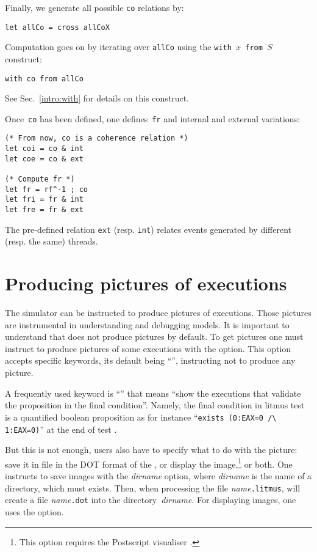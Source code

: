 Finally, we generate all possible \texttt{co} relations by:
\begin{verbatim}
let allCo = cross allCoX
\end{verbatim}

Computation goes on by iterating over \texttt{allCo} using
the \texttt{with $x$ from~$S$} construct:
\begin{verbatim}
with co from allCo
\end{verbatim}
See Sec.~\ref{intro:with} for details on this construct.

Once~\texttt{co} has been defined, one defines~\texttt{fr} and
internal and external variations:
\begin{verbatim}
(* From now, co is a coherence relation *)
let coi = co & int
let coe = co & ext

(* Compute fr *)
let fr = rf^-1 ; co
let fri = fr & int
let fre = fr & ext
\end{verbatim}
The pre-defined relation \texttt{ext} (resp. \texttt{int}) relates
events generated by different (resp. the same) threads.


\section{Producing pictures of executions}
The simulator \herd{} can be instructed to produce pictures of
executions.
Those pictures are instrumental in understanding and
debugging models.
It is important to understand that \herd{} does not produce pictures
by default. To get pictures one must instruct \herd{} to produce
pictures of some executions with the  option.
This option accepts specific keywords, its default being ``'',
instructing \herd{} not to produce any picture.

A frequently used keyword is ``'' that means ``show the executions
that validate the proposition in the final condition''.
Namely, the final condition in litmus test is a quantified
boolean proposition as for instance ``\verb+exists (0:EAX=0 /\ 1:EAX=0)+'' at the end of test .

But this is not enough, users also have to specify what to do with the picture:
save it in file in the DOT format of the
, or
display the image,\footnote{This option requires
the Postscript visualiser .} or both.
One instructs  \herd{} to save images with the \textit{dirname} option,
where \textit{dirname} is the name of a directory, which must exists.
Then, when processing the file \textit{name}\texttt{.litmus},
\herd{} will create a file \textit{name}\texttt{.dot} into the
directory~\textit{dirname}.
For displaying images, one uses the  option.

